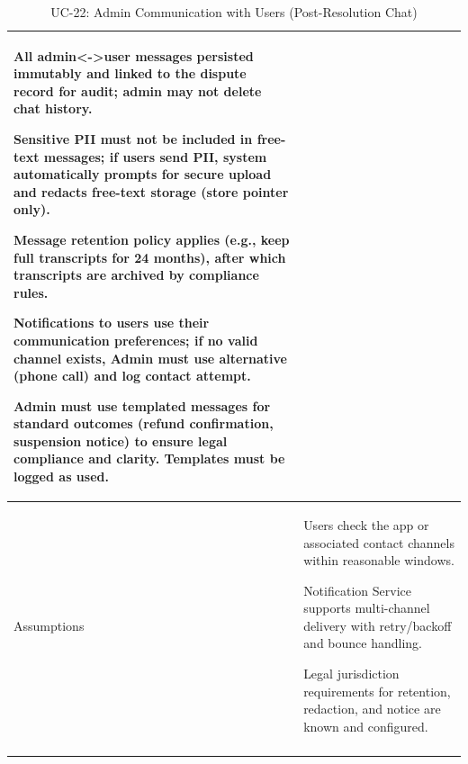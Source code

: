 \begin{longtable}{|p{3.5cm}|p{12cm}|}
All admin<->user messages persisted immutably and linked to the dispute record for audit; admin may not delete chat history.

Sensitive PII must not be included in free-text messages; if users send PII, system automatically prompts for secure upload and redacts free-text storage (store pointer only).

Message retention policy applies (e.g., keep full transcripts for 24 months), after which transcripts are archived by compliance rules.

Notifications to users use their communication preferences; if no valid channel exists, Admin must use alternative (phone call) and log contact attempt.

Admin must use templated messages for standard outcomes (refund confirmation, suspension notice) to ensure legal compliance and clarity. Templates must be logged as used. \\
\hline
Assumptions &
Users check the app or associated contact channels within reasonable windows.

Notification Service supports multi-channel delivery with retry/backoff and bounce handling.

Legal jurisdiction requirements for retention, redaction, and notice are known and configured. \\
\hline
\caption{UC-22: Admin Communication with Users (Post-Resolution Chat)}
\end{longtable}

